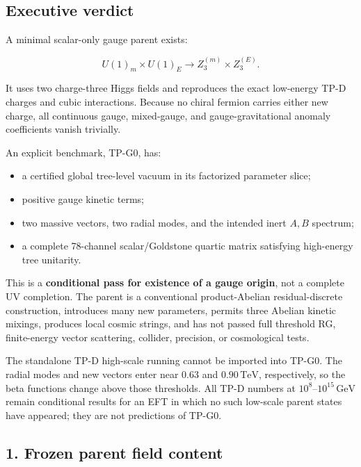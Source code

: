 \documentclass[
]{article}
\providecommand{\tightlist}{%
  \setlength{\itemsep}{0pt}\setlength{\parskip}{0pt}}
\begin{document}
\hypertarget{executive-verdict-3}{%
\subsection{Executive verdict}\label{executive-verdict-3}}

A minimal scalar-only gauge parent exists:

\[
U(1)_m\times U(1)_E
\longrightarrow Z_3^{(m)}\times Z_3^{(E)}.
\]

It uses two charge-three Higgs fields and reproduces the exact
low-energy TP-D charges and cubic interactions. Because no chiral
fermion carries either new charge, all continuous gauge, mixed-gauge,
and gauge-gravitational anomaly coefficients vanish trivially.

An explicit benchmark, TP-G0, has:

\begin{itemize}
\tightlist
\item
  a certified global tree-level vacuum in its factorized parameter
  slice;
\item
  positive gauge kinetic terms;
\item
  two massive vectors, two radial modes, and the intended inert \(A,B\)
  spectrum;
\item
  a complete 78-channel scalar/Goldstone quartic matrix satisfying
  high-energy tree unitarity.
\end{itemize}

This is a \textbf{conditional pass for existence of a gauge origin}, not
a complete UV completion. The parent is a conventional product-Abelian
residual-discrete construction, introduces many new parameters, permits
three Abelian kinetic mixings, produces local cosmic strings, and has
not passed full threshold RG, finite-energy vector scattering, collider,
precision, or cosmological tests.

The standalone TP-D high-scale running cannot be imported into TP-G0.
The radial modes and new vectors enter near \(0.63\) and
\(0.90\,\mathrm{TeV}\), respectively, so the beta functions change above
those thresholds. All TP-D numbers at
\(10^8\)--\(10^{15}\,\mathrm{GeV}\) remain conditional results for an
EFT in which no such low-scale parent states have appeared; they are not
predictions of TP-G0.

\hypertarget{frozen-parent-field-content}{%
\subsection{1. Frozen parent field
content}\label{frozen-parent-field-content}}
\end{document}
